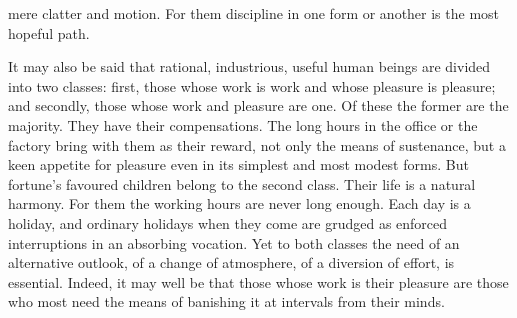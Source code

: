 \documentclass[kindlepaper]{BHCexam4kindle}
\begin{document}
mere clatter and motion. For them discipline in one form or another is the most hopeful path.
\par
It may also be said that rational, industrious, useful human beings are divided into two classes: first, those
whose work is work and whose pleasure is pleasure; and secondly, those whose work and pleasure are one. Of
these the former are the majority. They have their compensations. The long hours in the office or the factory
bring with them as their reward, not only the means of sustenance, but a keen appetite for pleasure even in its
simplest and most modest forms. But fortune's favoured children belong to the second class. Their life is a
natural harmony. For them the working hours are never long enough. Each day is a holiday, and ordinary
holidays when they come are grudged as enforced interruptions in an absorbing vocation. Yet to both classes
the need of an alternative outlook, of a change of atmosphere, of a diversion of effort, is essential. Indeed, it
may well be that those whose work is their pleasure are those who most need the means of banishing it at
intervals from their minds.
\clearpage
\end{document}
